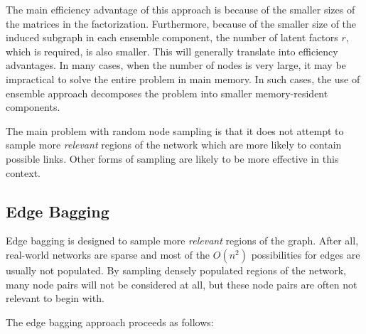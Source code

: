 The main efficiency advantage of this approach is because of the
smaller sizes of the matrices in the factorization. Furthermore,
because of the smaller size of the induced subgraph in each ensemble
component, the number of latent factors $r$, which is required, is
also smaller. This will generally translate into efficiency
advantages. In many cases, when the number of nodes is very large,
it may be impractical to solve the entire problem in main memory. In
such cases, the use of ensemble approach decomposes the problem into
smaller memory-resident components.

The main problem  with random node sampling is that it does not
attempt to sample more {\em relevant} regions of the network which are
more likely to contain possible links. Other forms of sampling are likely to
be more effective in this context.

\subsection{Edge Bagging}


Edge bagging is designed to sample more {\em relevant} regions of
the graph. After all, real-world networks are sparse and most of the
$O(n^2)$  possibilities for edges are usually not populated. By
sampling densely populated regions of the network, many node pairs
will not be considered at all, but these node pairs are often not
relevant to begin with.

The edge bagging approach proceeds as follows:

